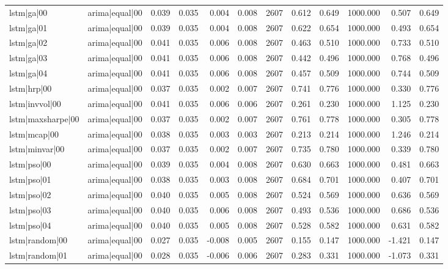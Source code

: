 \begin{table}
\begin{tabular}{llrrrrrrrrrr}
lstm|ga|00 & arima|equal|00 & 0.039 & 0.035 & 0.004 & 0.008 & 2607 & 0.612 & 0.649 & 1000.000 & 0.507 & 0.649 \\
lstm|ga|01 & arima|equal|00 & 0.039 & 0.035 & 0.004 & 0.008 & 2607 & 0.622 & 0.654 & 1000.000 & 0.493 & 0.654 \\
lstm|ga|02 & arima|equal|00 & 0.041 & 0.035 & 0.006 & 0.008 & 2607 & 0.463 & 0.510 & 1000.000 & 0.733 & 0.510 \\
lstm|ga|03 & arima|equal|00 & 0.041 & 0.035 & 0.006 & 0.008 & 2607 & 0.442 & 0.496 & 1000.000 & 0.768 & 0.496 \\
lstm|ga|04 & arima|equal|00 & 0.041 & 0.035 & 0.006 & 0.008 & 2607 & 0.457 & 0.509 & 1000.000 & 0.744 & 0.509 \\
lstm|hrp|00 & arima|equal|00 & 0.037 & 0.035 & 0.002 & 0.007 & 2607 & 0.741 & 0.776 & 1000.000 & 0.330 & 0.776 \\
lstm|invvol|00 & arima|equal|00 & 0.041 & 0.035 & 0.006 & 0.006 & 2607 & 0.261 & 0.230 & 1000.000 & 1.125 & 0.230 \\
lstm|maxsharpe|00 & arima|equal|00 & 0.037 & 0.035 & 0.002 & 0.007 & 2607 & 0.761 & 0.778 & 1000.000 & 0.305 & 0.778 \\
lstm|mcap|00 & arima|equal|00 & 0.038 & 0.035 & 0.003 & 0.003 & 2607 & 0.213 & 0.214 & 1000.000 & 1.246 & 0.214 \\
lstm|minvar|00 & arima|equal|00 & 0.037 & 0.035 & 0.002 & 0.007 & 2607 & 0.735 & 0.780 & 1000.000 & 0.339 & 0.780 \\
lstm|pso|00 & arima|equal|00 & 0.039 & 0.035 & 0.004 & 0.008 & 2607 & 0.630 & 0.663 & 1000.000 & 0.481 & 0.663 \\
lstm|pso|01 & arima|equal|00 & 0.038 & 0.035 & 0.003 & 0.008 & 2607 & 0.684 & 0.701 & 1000.000 & 0.407 & 0.701 \\
lstm|pso|02 & arima|equal|00 & 0.040 & 0.035 & 0.005 & 0.008 & 2607 & 0.524 & 0.569 & 1000.000 & 0.636 & 0.569 \\
lstm|pso|03 & arima|equal|00 & 0.040 & 0.035 & 0.006 & 0.008 & 2607 & 0.493 & 0.536 & 1000.000 & 0.686 & 0.536 \\
lstm|pso|04 & arima|equal|00 & 0.040 & 0.035 & 0.005 & 0.008 & 2607 & 0.528 & 0.582 & 1000.000 & 0.631 & 0.582 \\
lstm|random|00 & arima|equal|00 & 0.027 & 0.035 & -0.008 & 0.005 & 2607 & 0.155 & 0.147 & 1000.000 & -1.421 & 0.147 \\
lstm|random|01 & arima|equal|00 & 0.028 & 0.035 & -0.006 & 0.006 & 2607 & 0.283 & 0.331 & 1000.000 & -1.073 & 0.331 \\

\end{tabular}
\end{table}
